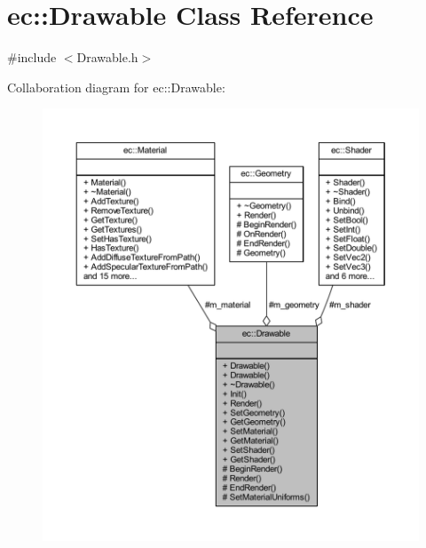 \hypertarget{classec_1_1_drawable}{}\section{ec\+:\+:Drawable Class Reference}
\label{classec_1_1_drawable}


{\ttfamily \#include $<$Drawable.\+h$>$}



Collaboration diagram for ec\+:\+:Drawable\+:
\nopagebreak
\begin{figure}[H]
\begin{center}
\leavevmode
\includegraphics[width=350pt]{classec_1_1_drawable__coll__graph}
\end{center}
\end{figure}
